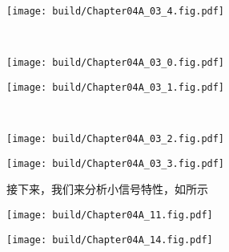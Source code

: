 \newpage
\begin{Figure}[推挽反相放大器的大信号特性]
    \begin{FigureSub}
        \texttt{[image: build/Chapter04A\_03\_4.fig.pdf]}
    \end{FigureSub}\\ \vspace{0.25cm}
    \begin{FigureSub}
        \texttt{[image: build/Chapter04A\_03\_0.fig.pdf]}
    \end{FigureSub}
    \begin{FigureSub}
        \texttt{[image: build/Chapter04A\_03\_1.fig.pdf]}
    \end{FigureSub}\\ \vspace{0.25cm}
    \begin{FigureSub}
        \texttt{[image: build/Chapter04A\_03\_2.fig.pdf]}
    \end{FigureSub}
    \begin{FigureSub}
        \texttt{[image: build/Chapter04A\_03\_3.fig.pdf]}
    \end{FigureSub}
\end{Figure}

接下来，我们来分析小信号特性，如所示
\begin{Figure}[电推挽反相放大器的大信号特性]
    \begin{FigureSub}
        \texttt{[image: build/Chapter04A\_11.fig.pdf]}
    \end{FigureSub}
    \begin{FigureSub}
        \texttt{[image: build/Chapter04A\_14.fig.pdf]}
    \end{FigureSub}
\end{Figure}

